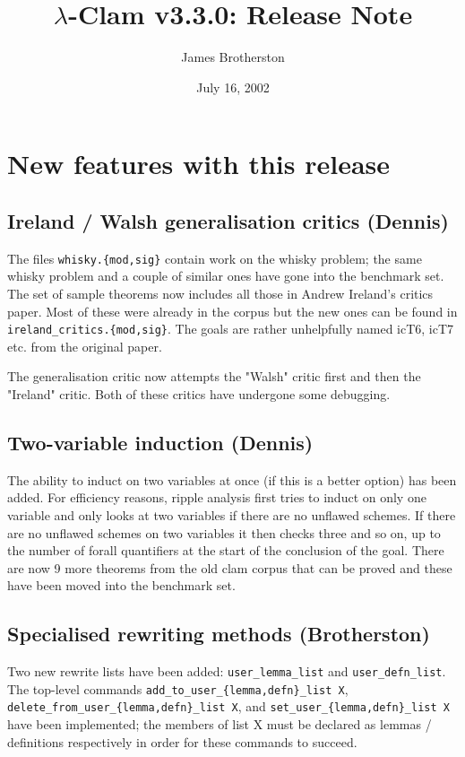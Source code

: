 \documentclass[11pt]{article}
\begin{document}
\title{$\lambda$-Clam v3.3.0: Release Note} 

\author{James Brotherston}

\date{July 16, 2002}

\maketitle

\section{New features with this release}

\subsection{Ireland / Walsh generalisation critics (Dennis)}
The files \texttt{whisky.\{mod,sig\}} contain work on the whisky
problem; the same whisky problem and a couple of similar ones have
gone into the benchmark set.  The set of sample theorems now includes
all those in Andrew Ireland's critics paper.  Most of these were
already in the corpus but the new ones can be found in
\texttt{ireland\_critics.\{mod,sig\}}.  The goals are rather
unhelpfully named icT6, icT7 etc. from the original paper.  

The generalisation critic now attempts the "Walsh" critic first and
then the "Ireland" critic.  Both of these critics have undergone some
debugging.  

\subsection{Two-variable induction (Dennis)}
The ability to induct on two variables at once (if this is a better
option) has been added.  For efficiency reasons, ripple analysis first
tries to induct on only one variable and only looks at two variables
if there are no unflawed schemes.  If there are no unflawed schemes on
two variables it then checks three and so on, up to the number of
forall quantifiers at the start of the conclusion of the goal.  There
are now 9 more theorems from the old clam corpus that can be proved
and these have been moved into the benchmark set.

\subsection{Specialised rewriting methods (Brotherston)}
Two new rewrite lists have been added: {\tt user\_lemma\_list} and
{\tt user\_defn\_list}.  The top-level commands \texttt
  {add\_to\_user\_\{lemma,defn\}\_list X}, \\
\texttt {delete\_from\_user\_\{lemma,defn\}\_list X}, and \texttt
  {set\_user\_\{lemma,defn\}\_list X} have been implemented; the
members of list X must be declared as lemmas / definitions
respectively in order for these commands to succeed.
\end{document}
